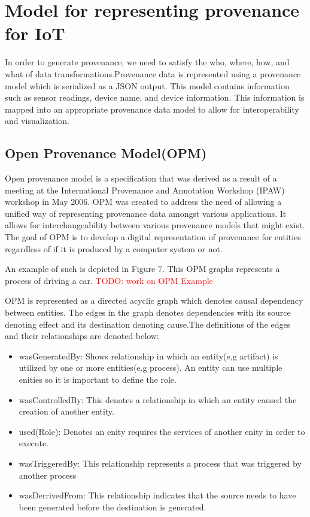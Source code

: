 \section{Model for representing provenance for IoT}

In order to generate provenance, we need to satisfy the who, where, how, and what of data transformations.Provenance data is represented using a provenance model which is serialized as a JSON output. This model contains information such as sensor readings, device name, and device information. This information is mapped into an appropriate provenance data model  to allow for interoperability and visualization.

\subsection{Open Provenance Model(OPM)}

Open provenance model is a specification that was derived as a result of a meeting at the International Provenance and Annotation Workshop (IPAW) workshop in May 2006. OPM was created to address the need of allowing a unified way of representing provenance data amongst various applications. It allows for interchangeability between various provenance models that might exist. The goal of OPM is to develop a digital representation of provenance for entities regardless of if it is produced by a computer system or not. 

An example of such is depicted in Figure 7. This OPM graphs represents a process of driving a car.  \textcolor{red}{TODO: work on OPM Example}



OPM is represented as a directed acyclic graph which denotes causal dependency between entities. The edges in the graph denotes dependencies with its source denoting effect and its destination denoting cause.The definitions of the edges and their relationships are denoted below: 


\begin{itemize}
\item wasGeneratedBy: Shows relationship in which an entity(e,g artifact) is utilized by one or  more entities(e.g process). An entity can use multiple enities so it is important to define the role.  
\item wasControlledBy: This denotes a relationship in which an entity caused the creation of another entity.
\item used(Role): Denotes an enity requires the services of another enity in order to execute.
\item wasTriggeredBy: This relationship represents a process that was triggered by another process
\item wasDerrivedFrom: This relationship indicates that the source needs to have been generated before the destination is generated.
\end{itemize}

